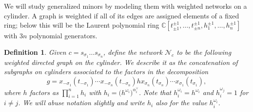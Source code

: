 \documentclass[12pt]{amsart}
\newcommand{\CC}{\mathbb{C}}
\newcommand{\cN}{\mathcal{N}} %
\newtheorem{definition}[theorem]{Definition}
\theoremstyle{remark}
\numberwithin{equation}{section}
\begin{document}
We will study generalized minors by modeling them with weighted networks on a cylinder. A graph is weighted if all of its edges are assigned elements of a fixed ring; below this will be the Laurent polynomial ring $\CC[t_{\pm1}^{\pm1},\dotsc,t_{\pm n}^{\pm1},h_1^{\pm1},\dotsc,h_n^{\pm1}]$ with $3n$ polynomial generators.

\begin{definition}
Given $c = s_{\sigma_1} \dotsc s_{\sigma_n}$, define the \emph{network} $\cN_c$ to be the following weighted directed graph on the cylinder. 
We describe it as the concatenation of subgraphs on cylinders associated to the factors in the decomposition 
\[g=x_{-\sigma_1}(t_{-\sigma_1})\cdots x_{-\sigma_n}(t_{-\sigma_n}) hx_{\sigma_n}(t_{\sigma_n}) \cdots x_{\sigma_1}(t_{\sigma_1}),\]
where $h$ factors as $\prod\limits_{i=1}^n h_i$ with $h_i=\big(h^{\omega_i}\big)^{\alpha_i^\vee}$.  
Note that $h_i^{\omega_i}=h^{\omega_i}$ and $h_i^{\omega_j}=1$ for $i\ne j$.  
We will abuse notation slightly and write $h_i$ also for the value $h_i^{\omega_i}$.


\end{definition}
\end{document}
